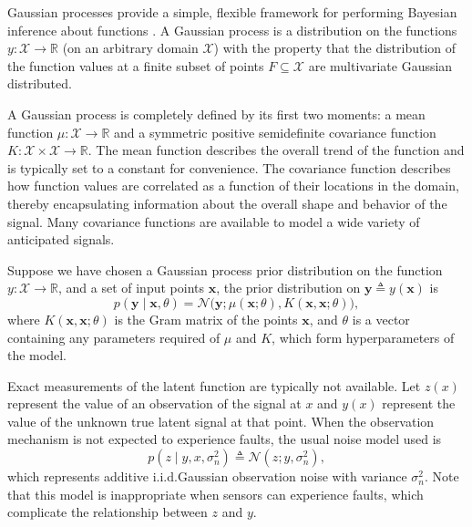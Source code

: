 \documentclass{article}
\newcommand{\R}{\ensuremath{\mathbb{R}}}
\newcommand{\deq}{\ensuremath{\triangleq}}
\newcommand{\given}{\ensuremath{\mid}}
\newcommand{\cm}[1]{\ensuremath{\mathcal{#1}}}
\newcommand{\bm}[1]{\ensuremath{\mathbf{#1}}}
\begin{document}
Gaussian processes provide a simple, flexible framework for performing
Bayesian inference about functions \citep{gpml}.  A Gaussian process
is a distribution on the functions $y\colon \cm{X} \to \R$ (on an
arbitrary domain $\cm{X}$) with the property that the distribution of
the function values at a finite subset of points $F \subseteq \cm{X}$
are multivariate Gaussian distributed.

A Gaussian process is completely defined by its first two moments: a
mean function $\mu\colon \cm{X} \to \R$ and a symmetric positive
semidefinite covariance function $K\colon \cm{X} \times \cm{X} \to
\R$.  The mean function describes the overall trend of the function
and is typically set to a constant for convenience.  The covariance
function describes how function values are correlated as a function of
their locations in the domain, thereby encapsulating information about
the overall shape and behavior of the signal.  Many covariance
functions are available to model a wide variety of anticipated
signals.

Suppose we have chosen a Gaussian process prior distribution on the
function $y\colon \cm{X} \to \R$, and a set of input points $\bm{x}$,
the prior distribution on $\bm{y} \deq y(\bm{x})$ is
\begin{equation*}
 p(\bm{y} \given \bm{x}, \theta)
 =
 \cm{N}
 \bigl(
   \bm{y};
   \mu(\bm{x}; \theta),
   K(\bm{x}, \bm{x}; \theta)
 \bigr),
\end{equation*}
where $K(\bm{x}, \bm{x}; \theta)$ is the Gram matrix of the points
$\bm{x}$, and $\theta$ is a vector containing any parameters required
of $\mu$ and $K$, which form hyperparameters of the model.

Exact measurements of the latent function are typically not available.
Let $z(x)$ represent the
value of an observation of the signal at $x$ and $y(x)$
represent the value of the unknown true latent signal at that point.
When the observation mechanism is not expected to experience faults,
the usual noise model used is
\begin{equation}\label{iidnoise}
 p(z \given y, x, \sigma_n^2)
 \deq
 \cm{N}(z; y, \sigma_n^2),
\end{equation}
which represents additive i.i.d.\space Gaussian observation noise with
variance $\sigma_n^2$. Note that this model is inappropriate when
sensors can experience faults, which complicate the relationship
between $z$ and $y$.
\end{document}
